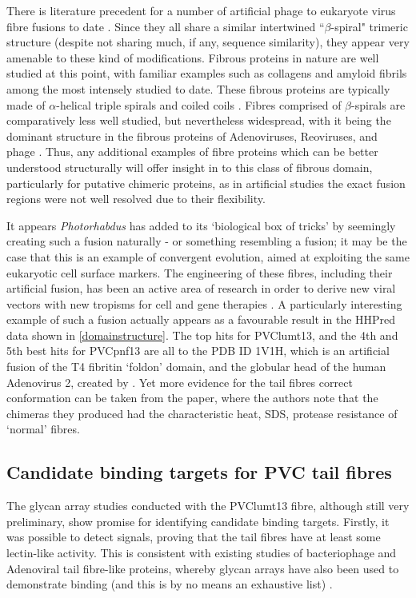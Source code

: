 There is literature precedent for a number of artificial phage to eukaryote virus fibre fusions to date \citep{Papanikolopoulou2004a, Papanikolopoulou2004, Krasnykh2001}. Since they all share a similar intertwined ``$\beta$-spiral" trimeric structure (despite not sharing much, if any, sequence similarity), they appear very amenable to these kind of modifications. Fibrous proteins in nature are well studied at this point, with familiar examples such as collagens and amyloid fibrils among the most intensely studied to date. These fibrous proteins are typically made of $\alpha$-helical triple spirals and coiled coils \citep{Beck1998}. Fibres comprised of $\beta$-spirals are comparatively less well studied, but nevertheless widespread, with it being the dominant structure in the fibrous proteins of Adenoviruses, Reoviruses, and phage \citep{Papanikolopoulou2004, Papanikolopoulou2004a}. Thus, any additional examples of fibre proteins which can be better understood structurally will offer insight in to this class of fibrous domain, particularly for putative chimeric proteins, as in artificial studies the exact fusion regions were not well resolved due to their flexibility.

It appears \emph{Photorhabdus} has added to its `biological box of tricks' by seemingly creating such a fusion naturally - or something resembling a fusion; it may be the case that this is an example of convergent evolution, aimed at exploiting the same eukaryotic cell surface markers. The engineering of these fibres, including their artificial fusion, has been an active area of research in order to derive new viral vectors with new tropisms for cell and gene therapies \citep{Krasnykh2001, Li2006}. A particularly interesting example of such a fusion actually appears as a favourable result in the HHPred data shown in \vref{domainstructure}. The top hits for PVClumt13, and the 4th and 5th best hits for PVCpnf13 are all to the PDB ID 1V1H, which is an artificial fusion of the T4 fibritin `foldon' domain, and the globular head of the human Adenovirus 2, created by \cite{Papanikolopoulou2004}. Yet more evidence for the tail fibres correct conformation can be taken from the paper, where the authors note that the chimeras they produced had the characteristic heat, SDS, protease resistance of `normal' fibres.


\subsection{Candidate binding targets for PVC tail fibres}
The glycan array studies conducted with the PVClumt13 fibre, although still very preliminary, show promise for identifying candidate binding targets. Firstly, it was possible to detect signals, proving that the tail fibres have at least some lectin-like activity. This is consistent with existing studies of bacteriophage and Adenoviral tail fibre-like proteins, whereby glycan arrays have also been used to demonstrate binding (and this is by no means an exhaustive list) \citep{Guardado-Calvo2010, Singh2015, Lenman2018, Nilsson2011}.

